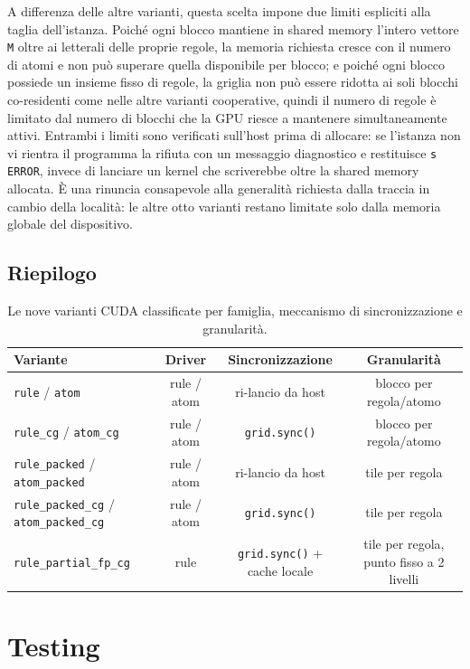 \documentclass[11pt,a4paper]{article}
\begin{document}
A differenza delle altre varianti, questa scelta impone due limiti espliciti alla taglia
dell'istanza. Poiché ogni blocco mantiene in shared memory l'intero vettore \texttt{M} oltre ai
letterali delle proprie regole, la memoria richiesta cresce con il numero di atomi e non può
superare quella disponibile per blocco; e poiché ogni blocco possiede un insieme fisso di regole,
la griglia non può essere ridotta ai soli blocchi co-residenti come nelle altre varianti
cooperative, quindi il numero di regole è limitato dal numero di blocchi che la GPU riesce a
mantenere simultaneamente attivi. Entrambi i limiti sono verificati sull'host prima di allocare:
se l'istanza non vi rientra il programma la rifiuta con un messaggio diagnostico e restituisce
\texttt{s ERROR}, invece di lanciare un kernel che scriverebbe oltre la shared memory allocata.
È una rinuncia consapevole alla generalità richiesta dalla traccia in cambio della località: le
altre otto varianti restano limitate solo dalla memoria globale del dispositivo.

\subsection{Riepilogo}

\begin{table}[h]
\centering
\small
\begin{tabular}{lccc}
\toprule
Variante & Driver & Sincronizzazione & Granularità \\
\midrule
\texttt{rule} / \texttt{atom} & rule / atom & ri-lancio da host & blocco per regola/atomo \\
\texttt{rule\_cg} / \texttt{atom\_cg} & rule / atom & \texttt{grid.sync()} & blocco per regola/atomo \\
\texttt{rule\_packed} / \texttt{atom\_packed} & rule / atom & ri-lancio da host & tile per regola \\
\texttt{rule\_packed\_cg} / \texttt{atom\_packed\_cg} & rule / atom & \texttt{grid.sync()} & tile per regola \\
\texttt{rule\_partial\_fp\_cg} & rule & \texttt{grid.sync()} + cache locale & tile per regola, punto fisso a 2 livelli \\
\bottomrule
\end{tabular}
\caption{Le nove varianti CUDA classificate per famiglia, meccanismo di sincronizzazione e granularità.}
\end{table}

\section{Testing}
\label{sec:testing}
\end{document}
